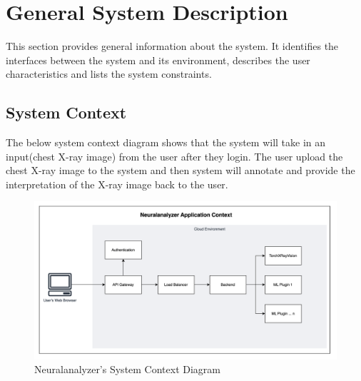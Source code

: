 \documentclass[12pt]{article}
\begin{document}
\section{General System Description}

This section provides general information about the system.  It identifies the
interfaces between the system and its environment, describes the user
characteristics and lists the system constraints. \\

\subsection{System Context}
 
The below system context diagram shows that the system will take in an input(chest X-ray image) from the user after they login. The user upload the chest X-ray image to the system and then system will annotate and provide the interpretation of the X-ray image back to the user.



\begin{figure}[h!]
  \centering
  \includegraphics[width=1\textwidth]{SystemContext.png}
  \caption{Neuralanalyzer's System Context Diagram}
  \label{fig:overall-infra}
\end{figure}
\end{document}
